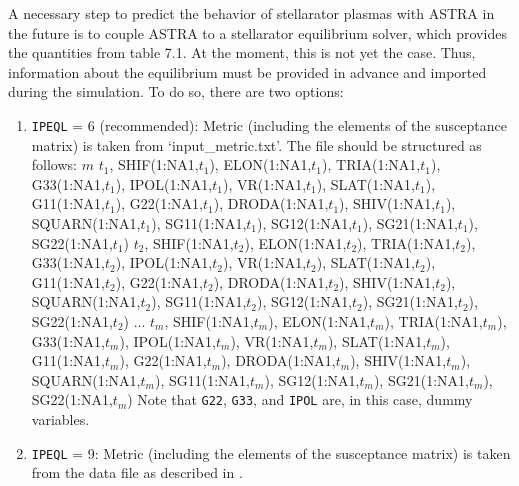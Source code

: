 A necessary step to predict the behavior of stellarator plasmas with ASTRA in the future is to couple ASTRA to a stellarator equilibrium solver, which provides the quantities from table 7.1. At the moment, this is not yet the case. Thus, information about the equilibrium must be provided in advance and imported during the simulation. To do so, there are two options:

\begin{enumerate}

\item \texttt{IPEQL} = 6 (recommended): Metric (including the elements of the susceptance matrix) is taken from `input\_metric.txt'. The file should be structured as follows:\newline \newline
$m$\newline
$t_1$, SHIF(1:NA1,$t_1$), ELON(1:NA1,$t_1$), TRIA(1:NA1,$t_1$), G33(1:NA1,$t_1$), \newline
IPOL(1:NA1,$t_1$), VR(1:NA1,$t_1$), SLAT(1:NA1,$t_1$), G11(1:NA1,$t_1$), G22(1:NA1,$t_1$), \newline
DRODA(1:NA1,$t_1$), SHIV(1:NA1,$t_1$), SQUARN(1:NA1,$t_1$), SG11(1:NA1,$t_1$), \newline
SG12(1:NA1,$t_1$), SG21(1:NA1,$t_1$), SG22(1:NA1,$t_1$) \newline
$t_2$, SHIF(1:NA1,$t_2$), ELON(1:NA1,$t_2$), TRIA(1:NA1,$t_2$), G33(1:NA1,$t_2$), \newline
IPOL(1:NA1,$t_2$), VR(1:NA1,$t_2$), SLAT(1:NA1,$t_2$), G11(1:NA1,$t_2$), G22(1:NA1,$t_2$), \newline
DRODA(1:NA1,$t_2$), SHIV(1:NA1,$t_2$), SQUARN(1:NA1,$t_2$), SG11(1:NA1,$t_2$), \newline
SG12(1:NA1,$t_2$), SG21(1:NA1,$t_2$), SG22(1:NA1,$t_2$)\newline
...\newline
$t_m$, SHIF(1:NA1,$t_m$), ELON(1:NA1,$t_m$), TRIA(1:NA1,$t_m$), G33(1:NA1,$t_m$), \newline
IPOL(1:NA1,$t_m$), VR(1:NA1,$t_m$), SLAT(1:NA1,$t_m$), G11(1:NA1,$t_m$), G22(1:NA1,$t_m$), \newline
DRODA(1:NA1,$t_m$), SHIV(1:NA1,$t_m$), SQUARN(1:NA1,$t_m$), SG11(1:NA1,$t_m$), \newline
SG12(1:NA1,$t_m$), SG21(1:NA1,$t_m$), SG22(1:NA1,$t_m$)\newline
Note that \texttt{G22}, \texttt{G33}, and \texttt{IPOL} are, in this case, dummy variables.


\item \texttt{IPEQL} = 9: Metric (including the elements of the susceptance matrix) is taken from the data file as described in \cite{ASTRAmanual}.



\end{enumerate}
